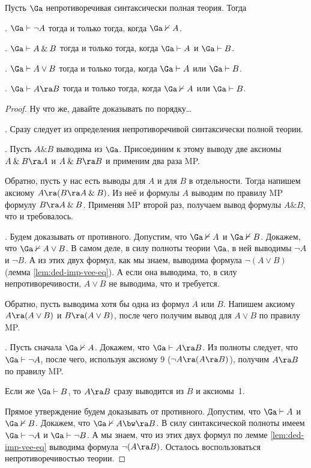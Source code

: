 \documentclass[a4paper,draft]{article}
\let\amper\&
\def\&{\mathbin{\amper}}
\begin{document}
\begin{lemma}
  Пусть $\Ga$ непротиворечивая синтаксически полная теория. Тогда\par
  . $\Ga \vdash \neg A$ тогда и только тогда, когда $\Ga \nvdash A$.\par
  . $\Ga \vdash A \& B$ тогда и только тогда, когда $\Ga \vdash A$ и $\Ga \vdash B$.\par
  . $\Ga \vdash A \vee B$ тогда и только тогда, когда $\Ga \vdash A$ или $\Ga \vdash B$.\par
  . $\Ga \vdash A \ra B$ тогда и только тогда, когда $\Ga \nvdash A$ или $\Ga \vdash B$.
\end{lemma}
\begin{proof} Ну что же, давайте доказывать по порядку\ldots\par
  . Сразу следует из определения непротиворечивой синтаксически полной теории.

  . Пусть $A \& B$ выводима из $\Ga$. Присоединим к этому выводу две аксиомы $A \& B \ra A$ и $A \& B \ra B$
  и применим два раза MP.

  Обратно, пусть у нас есть выводы для $A$ и для $B$ в отдельности. Тогда
  напишем аксиому $A \ra (B \ra A \& B)$. Из неё и формулы $A$ выводим по правилу MP
  формулу $B \ra A \& B$. Применяя MP второй раз, получаем вывод формулы $A \& B$, что и требовалось.

  . Будем доказывать от противного. Допустим, что $\Ga \nvdash A$ и $\Ga \nvdash B$. Докажем,
  что $\Ga \nvdash A \vee B$. В самом деле, в силу полноты теории $\Ga$, в ней выводимы
  $\neg A$ и $\neg B$. А из этих двух формул, как мы знаем, выводима формула $\neg (A \vee B)$ (лемма \ref{lem:ded-imp-vee-eq}).
  А если она выводима, то, в силу непротиворечивости, $A \vee B$ не выводима, что и требуется.

  Обратно, пусть выводима хотя бы одна из формул $A$ или $B$. Напишем аксиому $A \ra (A \vee B)$ и $B \ra(A \vee B)$,
  после чего получим вывод для $A \vee B$ по правилу MP.

  . Пусть сначала $\Ga\nvdash A$. Докажем, что $\Ga \vdash A \ra B$.
  Из полноты следует, что $\Ga\vdash\neg A$, после чего, используя аксиому 9 ($\neg A \ra (A \ra B)$),
  получим $A \ra B$ по правилу MP.

  Если же $\Ga \vdash B$, то $A\ra B$ сразу выводится из $B$ и аксиомы~1.

  Прямое утверждение будем доказывать от противного. Допустим, что $\Ga \vdash A$ и $\Ga \nvdash B$.
  Докажем, что $\Ga \nvdash A \bw\ra B$. В силу синтаксической полноты имеем $\Ga \vdash \neg A$ и $\Ga \vdash \neg B$.
  А мы знаем, что из этих двух формул по лемме \ref{lem:ded-imp-vee-eq} выводима формула $\neg (A \ra B)$. Осталось
  воспользоваться непротиворечивостью теории.
\end{proof}
\end{document}
